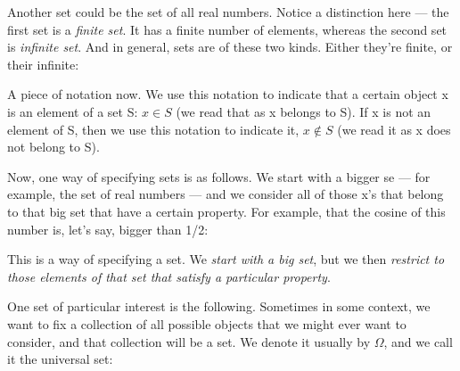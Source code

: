 \documentclass[pdftex, brazil, 12pt, twoside]{article}
\begin{document}
Another set could be the set of all real numbers.
Notice a distinction here ---
the first set is a \emph{finite set}.
It has a finite number of elements, whereas the second
set is \emph{infinite set}.
And in general, sets are of these two kinds.
Either they're finite, or their infinite:

\begin{figure}[H]
  \begin{center}
  \end{center}
\end{figure}

A piece of notation now.
We use this notation to indicate that a certain object
x is an element of a set S: $x \in S$ (we read that as x belongs to S).
If x is not an element of S, then we use this notation to
indicate it, $x \notin S$ (we read it as x does not belong to S).

Now, one way of specifying sets is as follows.
We start with a bigger se --- for example,
the set of real numbers ---
and we consider all of those x's that belong to that big
set that have a certain property.
For example, that the cosine of this number is, let's say,
bigger than 1/2:

\begin{figure}[H]
  \begin{center}
  \end{center}
\end{figure}

This is a way of specifying a set.
We \emph{start with a big set}, but we then \emph{restrict to those
  elements of that set that satisfy a particular property}.

One set of particular interest is the following.
Sometimes in some context, we want to fix a collection of
all possible objects that we might ever want to consider,
and that collection will be a set.
We denote it usually by $\Omega$, and we call it
the universal set:
\end{document}
